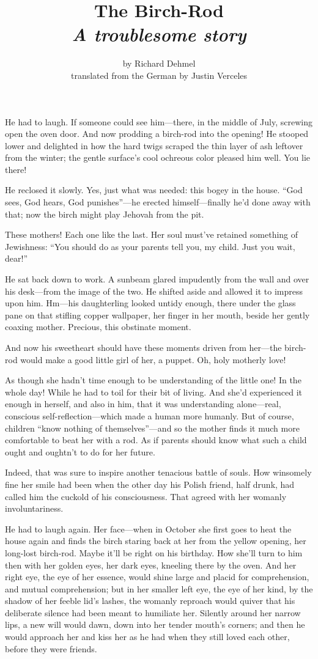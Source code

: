 \documentclass[12pt,a4paper]{article}
\title{The Birch-Rod\\ \large{\textit{A troublesome story}}}
\author{by Richard Dehmel\\translated from the German by Justin Verceles}
\date{}
\begin{document}
\maketitle

He had to laugh. If someone could see him—there, in the middle of July, screwing open the oven door. And now prodding a birch-rod into the opening! He stooped lower and delighted in how the hard twigs scraped the thin layer of ash leftover from the winter; the gentle surface’s cool ochreous color pleased him well. You lie there!

He reclosed it slowly. Yes, just what was needed: this bogey in the house. “God sees, God hears, God punishes”—he erected himself—finally he’d done away with that; now the birch might play Jehovah from the pit.

These mothers! Each one like the last. Her soul must’ve retained something of Jewishness: “You should do as your parents tell you, my child. Just you wait, dear!”

He sat back down to work. A sunbeam glared impudently from the wall and over his desk—from the image of the two. He shifted aside and allowed it to impress upon him. Hm—his daughterling looked untidy enough, there under the glass pane on that stifling copper wallpaper, her finger in her mouth, beside her gently coaxing mother. Precious, this obstinate moment.

And now his sweetheart should have these moments driven from her—the birch-rod would make a good little girl of her, a puppet. Oh, holy motherly love!

As though she hadn’t time enough to be understanding of the little one! In the whole day! While he had to toil for their bit of living. And she’d experienced it enough in herself, and also in him, that it was understanding alone—real, conscious self-reflection—which made a human more humanly. But of course, children “know nothing of themselves”—and so the mother finds it much more comfortable to beat her with a rod. As if parents should know what such a child ought and oughtn’t to do for her future.

Indeed, that was sure to inspire another tenacious battle of souls. How winsomely fine her smile had been when the other day his Polish friend, half drunk, had called him the cuckold of his consciousness. That agreed with her womanly involuntariness.

He had to laugh again. Her face—when in October she first goes to heat the house again and finds the birch staring back at her from the yellow opening, her long-lost birch-rod. Maybe it’ll be right on his birthday. How she’ll turn to him then with her golden eyes, her dark eyes, kneeling there by the oven. And her right eye, the eye of her essence, would shine large and placid for comprehension, and mutual comprehension; but in her smaller left eye, the eye of her kind, by the shadow of her feeble lid’s lashes, the womanly reproach would quiver that his deliberate silence had been meant to humiliate her. Silently around her narrow lips, a new will would dawn, down into her tender mouth’s corners; and then he would approach her and kiss her as he had when they still loved each other, before they were friends.
\end{document}
